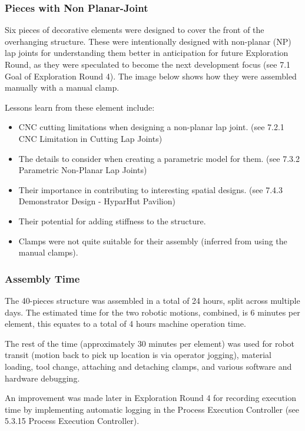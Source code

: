 \subsubsection{Pieces with Non Planar-Joint}
\label{subsubsection:exploration_2_pieces_with_non_planar_joint}

Six pieces of decorative elements were designed to cover the front of the overhanging structure. These were intentionally designed with non-planar (NP) lap joints for understanding them better in anticipation for future Exploration Round, as they were speculated to become the next development focus (see 7.1 Goal of Exploration Round 4). The image below shows how they were assembled manually with a manual clamp. 

Lessons learn from these element include:
\begin{itemize}
    \item CNC cutting limitations when designing a non-planar lap joint. (see 7.2.1 CNC Limitation in Cutting Lap Joints)
    \item The details to consider when creating a parametric model for them. (see 7.3.2 Parametric Non-Planar Lap Joints)
    \item Their importance in contributing to interesting spatial designs. (see 7.4.3 Demonstrator Design  - HyparHut Pavilion)
    \item Their potential for adding stiffness to the structure.
    \item Clamps were not quite suitable for their assembly (inferred from using the manual clamps).
\end{itemize}

\subsubsection{Assembly Time}
\label{subsubsection:exploration_2_assembly_time}

The 40-pieces structure was assembled in a total of 24 hours, split across multiple days. The estimated time for the two robotic motions, combined, is 6 minutes per element, this equates to a total of 4 hours machine operation time. 

The rest of the time (approximately 30 minutes per element) was used for robot transit (motion back to pick up location is via operator jogging), material loading, tool change, attaching and detaching clamps, and various software and hardware debugging. 

An improvement was made later in Exploration Round 4 for recording execution time by implementing automatic logging in the Process Execution Controller (see 5.3.15 Process Execution Controller). 

